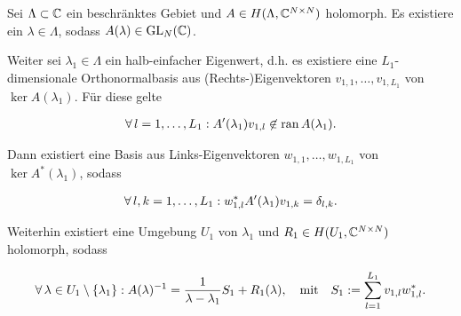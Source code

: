 \begin{theorem} \label{thm:keldysh_nicht_linear}

    Sei $\Lambda \subset \mathbb{C}$ ein beschränktes Gebiet und $A \in H(\Lambda, \mathbb{C}^{N \times N})$ holomorph.
    Es existiere ein $\lambda \in \Lambda$, sodass $A(\lambda) \in \operatorname{GL}_N(\mathbb{C})$.

    Weiter sei $\lambda_1 \in \Lambda$ ein halb-einfacher Eigenwert, d.h. es existiere eine $L_1$-dimensionale Orthonormalbasis aus (Rechts-)Eigenvektoren $v_{1, 1}, \dots, v_{1, L_1}$ von $\ker A(\lambda_1)$.
    Für diese gelte

    \begin{align} \label{eq:keldysh_nicht_linear_1}
        \forall \, l = 1, \dots, L_1:
            A^\prime(\lambda_1) v_{1, l}
            \not \in
            \operatorname{ran} A(\lambda_1).
    \end{align}

    Dann existiert eine Basis aus Links-Eigenvektoren $w_{1, 1}, \dots, w_{1, L_1}$ von $\ker A^\ast(\lambda_1)$, sodass

    \begin{align} \label{eq:keldysh_nicht_linear_2}
        \forall \, l, k = 1, \dots, L_1:
            w_{1, l}^\ast A^\prime(\lambda_1) v_{1, k} = \delta_{l, k}.
    \end{align}

    Weiterhin existiert eine Umgebung $U_1$ von $\lambda_1$ und $R_1 \in H(U_1, \mathbb{C}^{N \times N})$ holomorph, sodass

    \begin{align} \label{eq:keldysh_nicht_linear_3}
        \forall \, \lambda \in U_1 \setminus {\left \{ \lambda_1 \right \}}:
            A(\lambda)^{-1}
            =
            \frac{1}{\lambda - \lambda_1} S_1
            +
            R_1(\lambda),
            \quad
            \text{mit}
            \quad
            S_1
            :=
            \sum_{l=1}^{L_1}
                v_{1, l} w_{1, l}^\ast.
    \end{align}

\end{theorem}
